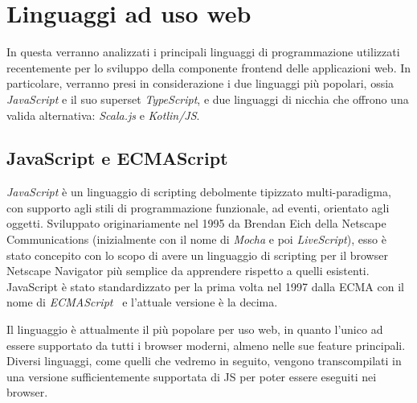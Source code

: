   \section{Linguaggi ad uso web}\label{sec:lang}
    In questa  verranno analizzati i principali linguaggi di programmazione utilizzati recentemente per lo sviluppo della componente frontend delle applicazioni web.
    In particolare, verranno presi in considerazione i due linguaggi più popolari, ossia \emph{JavaScript} e il suo superset \emph{TypeScript}, e due linguaggi di nicchia che offrono una valida alternativa: \emph{Scala.js} e \emph{Kotlin/JS}\@.

    \subsection{JavaScript e ECMAScript}\label{subsec:js}


      \emph{JavaScript} è un linguaggio di scripting debolmente tipizzato multi-paradigma, con supporto agli stili di programmazione funzionale, ad eventi, orientato agli oggetti.
      Sviluppato originariamente nel 1995 da Brendan Eich della Netscape Communications (inizialmente con il nome di \emph{Mocha} e poi \emph{LiveScript}),
      esso è stato concepito con lo scopo di avere un linguaggio di scripting per il browser Netscape Navigator più semplice da apprendere rispetto a quelli esistenti.
      JavaScript è stato standardizzato per la prima volta nel 1997 dalla ECMA con il nome di \emph{ECMAScript}~\cite{ECMA-262,ISO:1998} e l'attuale versione è la decima.

      Il linguaggio è attualmente il più popolare per uso web, in quanto l'unico ad essere supportato da tutti i browser moderni, almeno nelle sue feature principali.
      Diversi linguaggi, come quelli che vedremo in seguito, vengono transcompilati in una versione sufficientemente supportata di JS per poter essere eseguiti nei browser.

